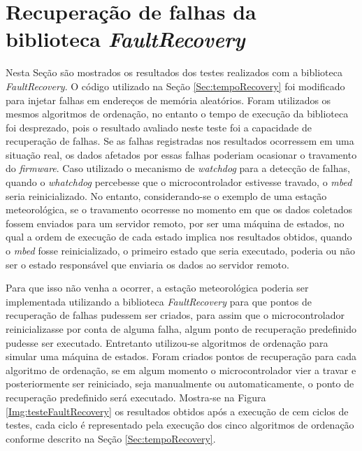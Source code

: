 \newpage
\section{Recuperação de falhas da biblioteca \textit{FaultRecovery}}\label{Sec:recupeFault}

Nesta Seção são mostrados os resultados dos testes realizados com a biblioteca \textit{FaultRecovery}. O código utilizado na Seção \ref{Sec:tempoRecovery} foi modificado para injetar falhas em endereços de memória aleatórios. Foram utilizados os mesmos algoritmos de ordenação, no entanto o tempo de execução da biblioteca foi desprezado, pois o resultado avaliado neste teste foi a capacidade de recuperação de falhas. Se as falhas registradas nos resultados ocorressem em uma situação real, os dados afetados por essas falhas poderiam ocasionar o travamento do \textit{firmware}. Caso utilizado o mecanismo de \textit{watchdog} para a detecção de falhas, quando o \textit{whatchdog} percebesse que o microcontrolador estivesse travado, o \textit{mbed} seria reinicializado. No entanto, considerando-se o exemplo de uma estação meteorológica, se o travamento ocorresse no momento em que os dados coletados fossem enviados para um servidor remoto, por ser uma máquina de estados, no qual a ordem de execução de cada estado implica nos resultados obtidos, quando o \textit{mbed} fosse reinicializado, o primeiro estado que seria executado, poderia ou não ser o estado responsável que enviaria os dados ao servidor remoto.

Para que isso não venha a ocorrer, a estação meteorológica poderia ser implementada utilizando a biblioteca \textit{FaultRecovery} para que pontos de recuperação de falhas pudessem ser criados, para assim que o microcontrolador reinicializasse por conta de alguma falha, algum ponto de recuperação predefinido pudesse ser executado. Entretanto utilizou-se algoritmos de ordenação para simular uma máquina de estados. Foram criados pontos de recuperação para cada algoritmo de ordenação, se em algum momento o microcontrolador vier a travar e posteriormente ser reiniciado, seja manualmente ou automaticamente, o ponto de recuperação predefinido será executado. Mostra-se na Figura \ref{Img:testeFaultRecovery} os resultados obtidos após a execução de cem ciclos de testes, cada ciclo é representado pela execução dos cinco algoritmos de ordenação conforme descrito na Seção \ref{Sec:tempoRecovery}. 


